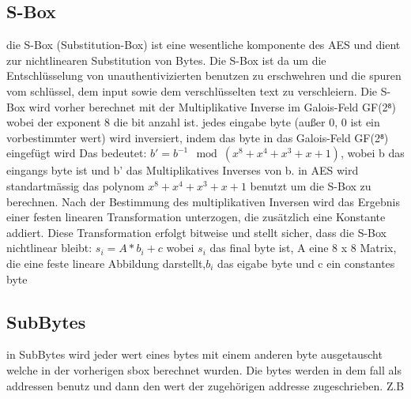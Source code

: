 \subsection{S-Box}
die S-Box (Substitution-Box) ist eine wesentliche komponente des AES und dient zur nichtlinearen Substitution von Bytes. 
Die S-Box ist da um die Entschlüsselung von unauthentivizierten benutzen zu erschwehren und die spuren vom schlüssel, dem 
input sowie dem verschlüsselten text zu verschleiern. Die S-Box wird vorher berechnet mit der Multiplikative Inverse im Galois-Feld GF(2⁸) 
wobei der exponent 8 die bit anzahl ist. jedes eingabe byte (außer 0, 0 ist ein vorbestimmter wert) wird inversiert, indem das byte in das Galois-Feld GF(2⁸) eingefügt wird 
Das bedeutet: $b' = b^{-1} \mod (x^8 + x^4 + x^3 + x + 1)$, wobei b das eingangs byte ist und b' das Multiplikatives Inverses von b. in AES wird standartmässig 
das polynom $x^8 + x^4 + x^3 + x + 1$ benutzt um die S-Box zu berechnen. Nach der Bestimmung des multiplikativen Inversen wird das 
Ergebnis einer festen linearen Transformation unterzogen, die zusätzlich eine Konstante addiert. Diese Transformation erfolgt bitweise und stellt sicher, dass die S-Box 
nichtlinear bleibt: $s_i = A * b_i +c$ wobei $s_i$ das final byte ist, A eine 8 x 8 Matrix, die eine feste lineare Abbildung darstellt,$b_i$ das eigabe 
byte und c ein constantes byte 



\subsection{SubBytes}
in SubBytes wird jeder wert eines bytes mit einem anderen byte ausgetauscht welche in der vorherigen sbox berechnet wurden. 
Die bytes werden in dem fall als addressen benutz und dann den wert der zugehörigen addresse zugeschrieben. Z.B \\
 \begin{table}[H]
    
    \caption{Beispiel einer S-Box im AES-Algorithmus}
\end{table}


